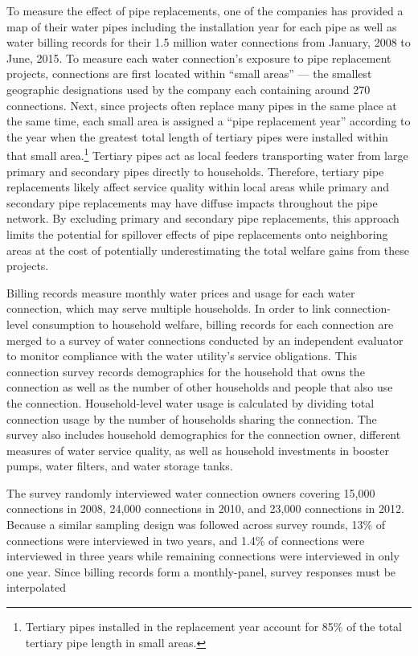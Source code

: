 \documentclass[12pt,table]{article}
\begin{document}
To measure the effect of pipe replacements, one of the companies has provided a map of their water pipes including the installation year for each pipe as well as water billing records for their 1.5 million water connections from January, 2008 to June, 2015.  To measure each water connection's exposure to pipe replacement projects, connections are first located within ``small areas'' --- the smallest geographic designations used by the company each containing around 270 connections.  Next, since projects often replace many pipes in the same place at the same time, each small area is assigned a ``pipe replacement year'' according to the year when the greatest total length of tertiary pipes were installed within that small area.\footnote{Tertiary pipes installed in the replacement year account for 85\% of the total tertiary pipe length in small areas.}  Tertiary pipes act as local feeders transporting water from large primary and secondary pipes directly to households.  Therefore, tertiary pipe replacements likely affect service quality within local areas while primary and secondary pipe replacements may have diffuse impacts throughout the pipe network.  By excluding primary and secondary pipe replacements, this approach limits the potential for spillover effects of pipe replacements onto neighboring areas at the cost of potentially underestimating the total welfare gains from these projects.  

Billing records measure monthly water prices and usage for each water connection, which may serve multiple households.  In order to link connection-level consumption to household welfare, billing records for each connection are merged to a survey of water connections conducted by an independent evaluator to monitor compliance with the water utility's service obligations.  This connection survey records demographics for the household that owns the connection as well as the number of other households and people that also use the connection.  Household-level water usage is calculated by dividing total connection usage by the number of households sharing the connection.  The survey also includes household demographics for the connection owner, different measures of water service quality, as well as household investments in booster pumps, water filters, and water storage tanks.

The survey randomly interviewed water connection owners covering 15,000 connections in 2008, 24,000 connections in 2010, and 23,000 connections in 2012.  Because a similar sampling design was followed across survey rounds, 13\% of connections were interviewed in two years, and 1.4\% of connections were interviewed in three years while remaining connections were interviewed in only one year.  Since billing records form a monthly-panel, survey responses must be interpolated
\end{document}
